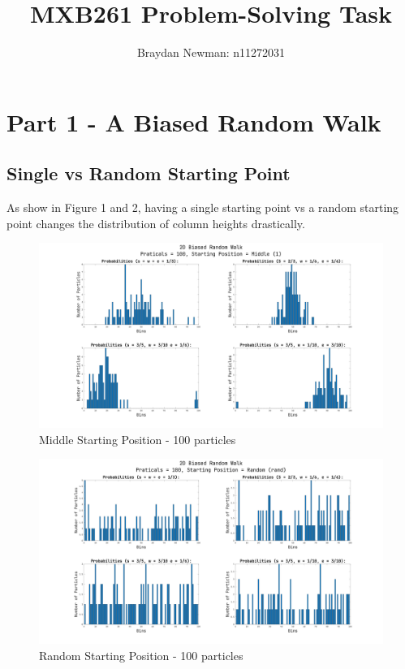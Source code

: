 \documentclass[a4paper]{article}
\author{Braydan Newman: n11272031}
\title{MXB261 Problem-Solving Task}
\begin{document}
\maketitle
\tableofcontents

\newpage

\section{Part 1 - A Biased Random Walk}

\subsection{Single vs Random Starting Point}
 As show in Figure 1 and 2, having a single starting point vs a random starting point changes the distribution of column heights drastically.

\begin{figure}[h!]
  \includegraphics[width=\textwidth]{part1/p1_figure1}
  \caption{Middle Starting Position - 100 particles}
  \label{fig:msp}
\end{figure}

\begin{figure}[h!]
  \includegraphics[width=\textwidth]{part1/p1_figure3}
  \caption{Random Starting Position - 100 particles}
  \label{fig:rsp}
\end{figure}
\end{document}
